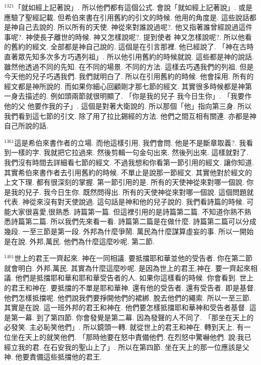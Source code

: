 \documentclass{book}
\begin{document}
$^{1321}$「就如經上記著說」.
所以他們都有這個公式.
會說「就如經上記著說」.
或是應驗了聖經記載.
但希伯來書在引用舊約的引文的時候.
他用的角度是.
這些說話都是神自己去說的.
所以所有的天使.
神從來對誰說過呢?.
他又指著誰曾經說過這件事呢?.
神使長子離世的時候.
神又怎樣說呢?.
提到使者 神又怎樣說呢?.
所以他看的舊約的經文.
全部都是神自己說的.
這個是在引言那裡.
他已經說了.
「神在古時直著眾先知多次多方巧遇列祖」.
所以他引用舊約的時候就說.
這些都是神的說話.
雖然他透過不同的先知.
在不同的場景.
不同的方法.
這樣去巧遇我們的列祖.
但是今天他的兒子巧遇我們.
我們就明白了.
所以在引用舊約的時候.
他會採用.
所有的經文都是神所說的.
而如果你細心回顧剛才那七節的經文.
其實很多時候都是神第一身去描述的.
例如頭兩節就很明顯了.
「你是我的兒子 我今日生你」.
「我要作他的父 他要作我的子」.
這個是對著大衛說的.
所以那個「他」指向第三身.
所以我們看到這七節的引文.
除了用了拉比錫經的方法.
他們之間互相有關連.
亦都是神自己所說的話.

$^{1361}$這是希伯來書作者的立場.
而他這樣引用.
我們會問.
他是不是斷章取義?.
我看到一樣的字.
我就把它拉過來.
然後剪輯一句金句出來.
然後列出來.
這樣就對了.
我們沒有時間去詳細看七節的經文.
不過我想和你看第一節引用的經文.
讓你知道.
其實希伯來書作者去引用舊約的時候.
不單止是說那一節經文.
其實他對於經文的上文下理.
都有很深刻的掌握.
第一節引用的是.
所有的天使神從來對哪一個說.
你是我的兒子.
我今日生你.
既然問得出.
所有的天使神從來對哪一個說.
這個問題就代表.
神從來沒有對天使說過.
這句話是神和他的兒子說的.
我們看詩篇的時候.
可能大家很喜愛,很熟悉.
詩篇第一篇.
但這裡引用的是詩篇第二篇.
不知道你熟不熟悉詩篇第二篇.
所以我們先來看一看.
詩篇第二篇是在做什麼.
詩篇第二篇可以分成幾段.
一至三節是第一段.
外邦為什麼爭鬧.
萬民為什麼謀算虛妄的事.
所以一開始是在說.
外邦,萬民.
他們為什麼這麼吵呢.
第二節.

$^{1401}$世上的君王一齊起來.
神在一同相議.
要抵擋耶和華並他的受告者.
你在第二節就會明白.
外邦,萬民.
其實為什麼這麼吵呢.
是因為世上的君王,神在.
要一齊起來相議.
他們是抵擋耶和華和耶和華受告者的人.
如果你這樣看的時候.
你會看到.
世上的君王和神在.
要抵擋的不單是耶和華神.
還有他的受告者.
還有受告者.
即是基督.
他們怎樣抵擋呢.
他們說我們要掙開他們的裙綁.
脫去他們的繩索.
所以一至三節.
其實是在說.
這一班外邦的君王和神在.
他們要怎樣抵擋耶和華神和受告者基督.
這是第一幕.
到了第四節.
你會發覺是第二幕.
因為發聲的人不同了.
「那坐在天上的必發笑.
主必恥笑他們」.
所以鏡頭一轉.
就從世上的君王和神在.
轉到天上.
有一位坐在天上的就笑他們.
「那時他要在怒中責備他們.
在烈怒中驚嚇他們.
說:我已經立我的君.
在石安我的聖山上了」.
所以在第四節.
坐在天上的那一位應該是父神.
他要責備這些抵擋他的君王.
\end{document}
